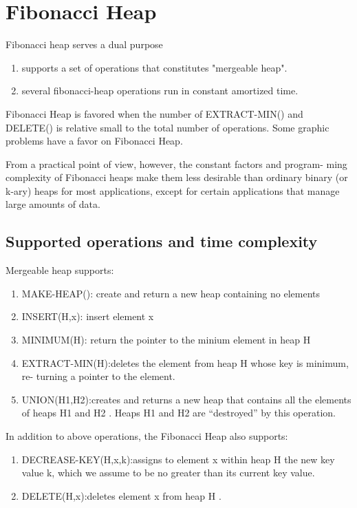 \section{Fibonacci Heap}
    
    Fibonacci heap serves a dual purpose
    \begin{enumerate}
        \item supports a set of operations that constitutes "mergeable heap".
        \item several fibonacci-heap operations run in constant amortized time.
    \end{enumerate}

    Fibonacci Heap is favored when the number of EXTRACT-MIN() and DELETE() is 
    relative small to the total number of operations.
    Some graphic problems have a favor on Fibonacci Heap.

    From a practical point of view, however, the constant factors and program-
ming complexity of Fibonacci heaps make them less desirable than ordinary binary
(or k-ary) heaps for most applications, except for certain applications that manage
large amounts of data.



\subsection{Supported operations and time complexity}

    Mergeable heap supports:
    \begin{enumerate}
        \item MAKE-HEAP(): create and return a new heap containing no elements
        \item INSERT(H,x): insert element x
        \item MINIMUM(H): return the pointer to the minium element in heap H
        \item EXTRACT-MIN(H):deletes the element from heap H whose key is minimum, re-
        turning a pointer to the element.
        \item UNION(H1,H2):creates and returns a new heap that contains all the elements of
        heaps H1 and H2 . Heaps H1 and H2 are “destroyed” by this operation.
    \end{enumerate}

    In addition to above operations, the Fibonacci Heap also supports:
    \begin{enumerate}
        \item DECREASE-KEY(H,x,k):assigns to element x within heap H the new key
        value k, which we assume to be no greater than its current key value.
        \item DELETE(H,x):deletes element x from heap H .
    \end{enumerate}

